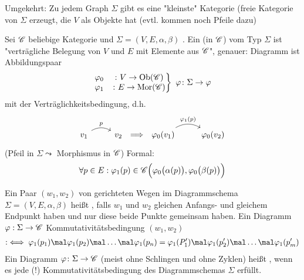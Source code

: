 Umgekehrt: Zu jedem Graph $\Sigma$ gibt es eine "kleinste" Kategorie (freie Kategorie von $\Sigma$ erzeugt, die $V$ als Objekte hat (evtl. kommen noch Pfeile dazu)
\begin{definition}\enter
	Sei $\mathscr C$ beliebige Kategorie und $\Sigma=(V,E,\alpha,\beta)$ .
	Ein  (in $\mathscr C$) vom Typ $\Sigma$ ist "verträgliche Belegung von $V$ und $E$ mit Elemente aus $\mathscr C$", genauer:
	Diagramm ist Abbildungspaar
	\begin{align*}
	\left.\begin{matrix}
		\varphi_0&\colon V\to\operatorname{Ob}(\mathscr C)\\
		\varphi_1&\colon E\to\operatorname{Mor}(\mathscr C)
	\end{matrix}\right\rbrace~\varphi\colon\Sigma\to\varphi
	\end{align*}
	mit der Verträglichkeitsbedingung, d.h.
	\begin{align*}
		\begin{tikzcd}[ampersand replacement=\&]
v_1 \arrow[r, "p", bend left] \& v_2
\end{tikzcd}\implies
	\begin{tikzcd}[ampersand replacement=\&]
\varphi_0(v_1) \arrow[r, "\varphi_1(p)", bend left] \& \varphi_0(v_2)
\end{tikzcd}
	\end{align*}
	(Pfeil in $\Sigma\leadsto$ Morphismus in $\mathscr C$)
	Formal:
	\begin{align*}
		\forall p\in E:\varphi_1(p)\in\mathscr C\Big(\varphi_0\big(\alpha(p)\big),\varphi_0\big(\beta(p)\big)\Big)
\end{align*}		
	
	Ein Paar $(w_1,w_2)$ von gerichteten Wegen im Diagrammschema $\Sigma=(V,E,\alpha,\beta)$ heißt , falls $w_1$ und $w_2$ gleichen Anfangs- und gleichem Endpunkt haben und nur diese beide Punkte gemeinsam haben.\nl
	Ein Diagramm $\varphi:\Sigma\to\mathscr C$  Kommutativitätsbedingung $(w_1,w_2)$
	\begin{align*}
		:\iff\varphi_1(p_1)\mal\varphi_1(p_2)\mal\ldots\mal\varphi_1(p_n)
		=\varphi_1(P_1')\mal\varphi_1(p_2')\mal\ldots\mal\varphi_1(p_m')
	\end{align*}
	Ein Diagramm $\varphi\colon\Sigma\to\mathscr C$ (meist ohne Schlingen und ohne Zyklen) heißt , wenn es jede (!) Kommutativitätsbedingung des Diagrammschemas $\Sigma$ erfüllt.
\end{definition}
